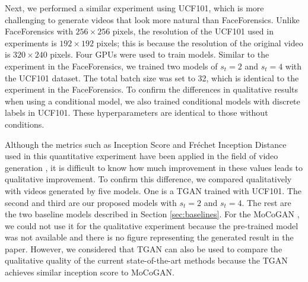 \documentclass[twocolumn]{svjour3}
\def\Sec#1{Section \ref{sec:#1}}
\begin{document}
Next, we performed a similar experiment using UCF101,
which is more challenging to generate videos that look more natural than FaceForensics.
Unlike FaceForensics with $256 \times 256$ pixels,
the resolution of the UCF101 used in experiments is $192 \times 192$ pixels;
this is because the resolution of the original video is $320 \times 240$ pixels.
Four GPUs were used to train models.
Similar to the experiment in the FaceForensics, we trained two models of $s_t=2$ and $s_t=4$ with the UCF101 dataset.
The total batch size was set to 32, which is identical to the experiment in the FaceForensics.
To confirm the differences in qualitative results when using a conditional model,
we also trained conditional models with discrete labels in UCF101.
These hyperparameters are identical to those without conditions.















Although the metrics such as Inception Score and Fr\'echet Inception Distance used in
this quantitative experiment have been applied in the field of video generation
\cite{Saito2017,Tulyakov2018,Unterthiner2018},
it is difficult to know how much improvement in these values leads to qualitative improvement.
To confirm this difference, we compared qualitatively with videos generated by five models.
One is a TGAN \cite{Saito2017} trained with UCF101.
The second and third are our proposed models with $s_t=2$ and $s_t=4$.
The rest are the two baseline models described in \Sec{baselines}.
For the MoCoGAN \cite{Tulyakov2018},
we could not use it for the qualitative experiment
because the pre-trained model was not available and
there is no figure representing the generated result in the paper.
However, we considered that TGAN can also be used to compare the qualitative quality of
the current state-of-the-art methods because the TGAN achieves similar inception score to MoCoGAN.
\end{document}
